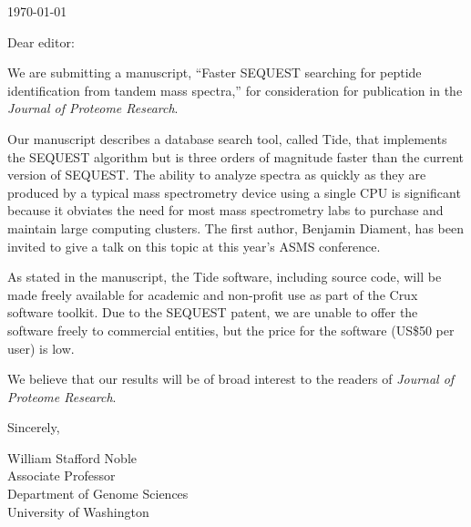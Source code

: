 \documentclass[12pt]{article}
\begin{document}
\hspace*{3.0in}\today

\vspace*{3ex}

\noindent
Dear editor:

\vspace*{1ex}

We are submitting a manuscript, ``Faster SEQUEST searching for peptide
identification from tandem mass spectra,'' for consideration for
publication in the {\em Journal of Proteome Research}.

Our manuscript describes a database search tool, called Tide, that
implements the SEQUEST algorithm but is three orders of magnitude
faster than the current version of SEQUEST.  The ability to analyze
spectra as quickly as they are produced by a typical mass spectrometry
device using a single CPU is significant because it obviates the need
for most mass spectrometry labs to purchase and maintain large
computing clusters.  The first author, Benjamin Diament, has been
invited to give a talk on this topic at this year's ASMS conference.

As stated in the manuscript, the Tide software, including source code,
will be made freely available for academic and non-profit use as part
of the Crux software toolkit.  Due to the SEQUEST patent, we are
unable to offer the software freely to commercial entities, but the
price for the software (US\$50 per user) is low.

We believe that our results will be of broad interest to the readers
of {\em Journal of Proteome Research}.

\vspace*{1ex}

\noindent
Sincerely,

\hspace*{1ex}

\noindent
William Stafford Noble\\
Associate Professor\\
Department of Genome Sciences\\
University of Washington
\end{document}
